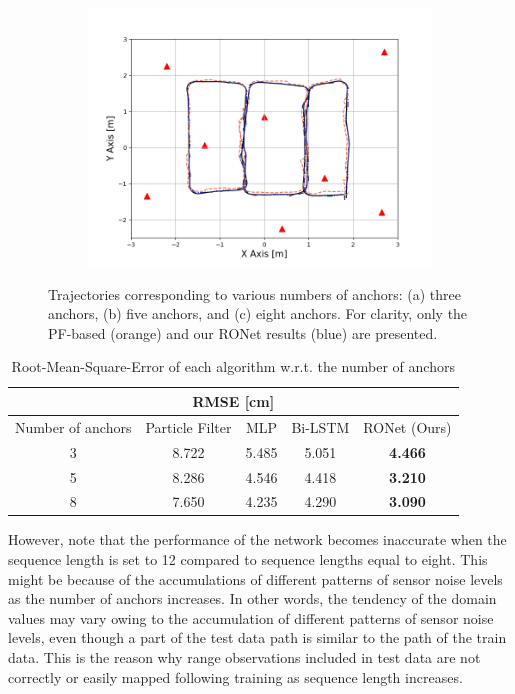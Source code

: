 \documentclass[letterpaper, 10 pt, conference]{ieeeconf}
\begin{document}
\begin{figure}[h]
	\begin{subfigure}[b]{0.32\textwidth}
		\includegraphics[width=\textwidth]{image/trajectory_8}
		\caption{}
		\label{fig:anchor_8}
	\end{subfigure}
	\caption{Trajectories corresponding to various numbers of anchors: (a) three anchors, (b) five anchors, and (c) eight anchors. For clarity, only the PF-based (orange) and our RONet results (blue) are presented.}\label{fig:trajectories_358}
\end{figure}

\begin{table}[h]
	\centering
	\caption{Root-Mean-Square-Error of each algorithm w.r.t. the number of anchors}
	\begin{tabular}{ccccc}
		\toprule
		\multicolumn{5}{c}{RMSE {[}cm{]}}   \\ \midrule
		Number of anchors & Particle Filter\cite{gonzalez2009mobile} & MLP\cite{kumar2016localization} & Bi-LSTM\cite{lim2018effective} & RONet (Ours) \\ \cmidrule{2-5} 
		3             & 8.722 & 5.485 & 5.051 & \textbf{4.466} \\
		5             & 8.286 & 4.546 & 4.418 & \textbf{3.210} \\
		8             & 7.650 & 4.235 & 4.290 & \textbf{3.090} \\ \bottomrule
	\end{tabular}
	\label{table:rmse}
\end{table}

However, note that the performance of the network becomes inaccurate when the sequence length is set to 12 compared to sequence lengths equal to eight. This might be because of the accumulations of different patterns of sensor noise levels as the number of anchors increases. In other words, the tendency of the domain values may vary owing to the accumulation of different patterns of sensor noise levels, even though a part of the test data path is similar to the path of the train data. This is the reason why range observations included in test data are not correctly or easily mapped following training as sequence length increases.
\end{document}
